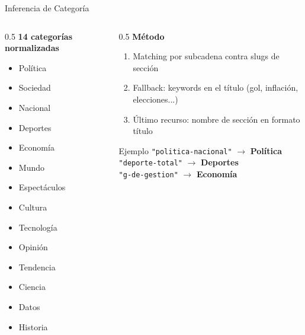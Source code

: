 \documentclass[11pt,aspectratio=169,spanish]{beamer}
\begin{document}
\begin{frame}{Inferencia de Categoría}
    \begin{columns}[T]
        \begin{column}{0.5\textwidth}
            \textbf{14 categorías normalizadas}
            \begin{itemize}
                \item Política
                \item Sociedad
                \item Nacional
                \item Deportes
                \item Economía
                \item Mundo
                \item Espectáculos
                \item Cultura
                \item Tecnología
                \item Opinión
                \item Tendencia
                \item Ciencia
                \item Datos
                \item Historia
            \end{itemize}
        \end{column}
        \begin{column}{0.5\textwidth}
            \textbf{Método}
            \begin{enumerate}
                \item Matching por subcadena contra slugs de sección
                \item Fallback: keywords en el título (gol, inflación, elecciones...)
                \item Último recurso: nombre de sección en formato título
            \end{enumerate}
            \vspace{0.3cm}
            \begin{block}{Ejemplo}
                \texttt{"politica-nacional"} $\to$ \textbf{Política}\\
                \texttt{"deporte-total"} $\to$ \textbf{Deportes}\\
                \texttt{"g-de-gestion"} $\to$ \textbf{Economía}
            \end{block}
        \end{column}
    \end{columns}
\end{frame}
\end{document}
